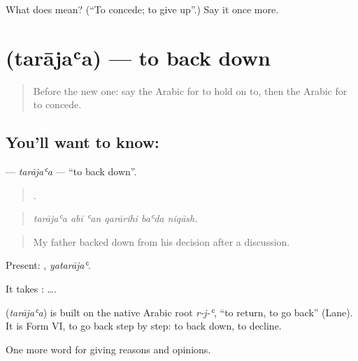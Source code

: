 \begin{tcolorbox}[breakable,colback=teal!4,colframe=teal!35!black,title={Before you move on}]
What does  mean? (\textquotedblleft{}To concede; to give up\textquotedblright{}.) Say it once more.
\end{tcolorbox}
\section[\texorpdfstring{\ar{تراجع} (tarājaʿa)}{تراجع (tarājaʿa)}]{ (tarājaʿa) — to back down}

\label{lesson:AR-C373-tarajaa}



\begin{quote}
Before the new one: say the Arabic for to hold on to, then the Arabic for to concede.
\end{quote}

\subsection*{You'll want to know: }
\textbf{} — \emph{tarājaʿa} — \textquotedblleft{}to back down\textquotedblright{}.

\begin{quote}
     .
\end{quote}

\begin{quote}
\emph{tarājaʿa abī ʿan qarārihi baʿda niqāsh.}
\end{quote}

\begin{quote}
My father backed down from his decision after a discussion.
\end{quote}

Present: , \emph{yatarājaʿ}.

It takes :   ….

\begin{cousinweb}
\textbf{} (\emph{tarājaʿa}) is built on the native Arabic root \emph{r-j-ʿ}, \textquotedblleft{}to return, to go back\textquotedblright{} (Lane). It is Form VI, to go back step by step: to back down, to decline.
\end{cousinweb}

\begin{grammarlens}[title={What you've built}]
One more word for giving reasons and opinions.
\end{grammarlens}


